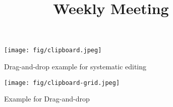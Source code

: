 \documentclass{sig-alternate}
\begin{document}



\title{Weekly Meeting } %

%
%

%
%
%

\maketitle






\begin{figure*}[!htb]
    \begin{minipage}{0.45\textwidth}
    \centering
\texttt{[image: fig/clipboard.jpeg]}
       \caption{Drag-and-drop example for systematic editing}
        \label{fig:clipboard}
 \end{minipage}%
  \hfill
     \begin{minipage}{0.45\textwidth}
     \centering
 \texttt{[image: fig/clipboard-grid.jpeg]}
       \caption{Example for Drag-and-drop}
        \label{fig:dndweb}
  \end{minipage}
    \hfill
   \end{figure*}
   
\end{document}
